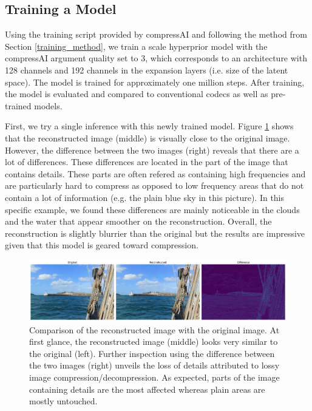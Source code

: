 \subsection{Training a Model}
Using the training script provided by compressAI and following the method from Section \ref{training_method}, we train a scale hyperprior model with the compressAI argument \textsf{quality} set to 3, which corresponds to an architecture with 128 channels and 192 channels in the expansion layers (i.e. size of the latent space). The model is trained for approximately one million steps. After training, the model is evaluated and compared to conventional codecs as well as pre-trained models.

First, we try a single inference with this newly trained model. Figure \ref{balle_repro_1} shows that the reconstructed image (middle) is visually close to the original image. However, the difference between the two images (right) reveals that there are a lot of differences. These differences are located in the part of the image that contains details. These parts are often refered as containing high frequencies and are particularly hard to compress as opposed to low frequency areas that do not contain a lot of information (e.g. the plain blue sky in this picture). In this specific example, we found these differences are mainly noticeable in the clouds and the water that appear smoother on the reconstruction. Overall, the reconstruction is slightly blurrier than the original but the results are impressive given that this model is geared toward compression.

\begin{figure}
    \centering
    \includegraphics[width=15cm]{../img/balle_repro_diff.png}
    \caption[Comparison of the reconstructed image with the original image.]{Comparison of the reconstructed image with the original image. At first glance, the reconstructed image (middle) looks very similar to the original (left). Further inspection using the difference between the two images (right) unveils the loss of details attributed to lossy image compression/decompression. As expected, parts of the image containing details are the most affected whereas plain areas are mostly untouched.}
    \label{balle_repro_1}
\end{figure}

